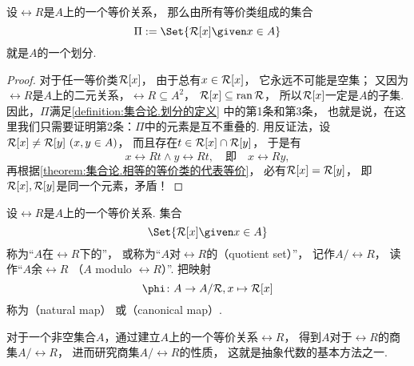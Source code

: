 \begin{theorem}
设\(\rel{R}\)是\(A\)上的一个等价关系，
那么由所有等价类组成的集合\begin{equation*}
	\Pi \defeq \Set{ \EquivalenceClassBH{x}[\rel{R}] \given x \in A }
\end{equation*}
就是\(A\)的一个划分.
\begin{proof}
对于任一等价类\(\EquivalenceClassBH{x}[\rel{R}]\)，
由于总有\(x \in \EquivalenceClassBH{x}[\rel{R}]\)，
它永远不可能是空集；
又因为\(\rel{R}\)是\(A\)上的二元关系，\(\rel{R} \subseteq A^2\)，
\(\EquivalenceClassBH{x}[\rel{R}] \subseteq \ran \rel{R}\)，
所以\(\EquivalenceClassBH{x}[\rel{R}]\)一定是\(A\)的子集.
因此，\(\Pi\)满足\cref{definition:集合论.划分的定义} 中的第1条和第3条，
也就是说，在这里我们只需要证明第2条：\(\Pi\)中的元素是互不重叠的.
用反证法，设\(\EquivalenceClassBH{x}[\rel{R}] \neq \rel{R}[y]\ (x,y \in A)\)，
而且存在\(t \in \EquivalenceClassBH{x}[\rel{R}] \cap \rel{R}[y]\)，
于是有\begin{equation*}
	x \rel{R} t \land y \rel{R} t,
	\quad\text{即}\quad
	x \rel{R} y,
\end{equation*}
再根据\cref{theorem:集合论.相等的等价类的代表等价}，
必有\(\EquivalenceClassBH{x}[\rel{R}] = \rel{R}[y]\)，
即\(\EquivalenceClassBH{x}[\rel{R}],\rel{R}[y]\)是同一个元素，矛盾！
\end{proof}
\end{theorem}

\begin{definition}\label{definition:集合论.商集的定义}
设\(\rel{R}\)是\(A\)上的一个等价关系.
集合\begin{equation*}
	\Set{ \EquivalenceClassBH{x}[\rel{R}] \given x \in A }
\end{equation*}
称为“\(A\)在\(\rel{R}\)下的”，
或称为“\(A\)对\(\rel{R}\)的（quotient set）”，
记作\(A/\rel{R}\)，
读作“\(A\)余\(\rel{R}\)
（\(A\) modulo \(\rel{R}\)）”.
把映射\begin{equation*}
	\phi\colon A \to A/\rel{R}, x \mapsto \EquivalenceClassBH{x}[\rel{R}]
\end{equation*}
称为（natural map）
或（canonical map）.
\end{definition}
对于一个非空集合\(A\)，通过建立\(A\)上的一个等价关系\(\rel{R}\)，
得到\(A\)对于\(\rel{R}\)的商集\(A/\rel{R}\)，
进而研究商集\(A/\rel{R}\)的性质，
这就是抽象代数的基本方法之一.

